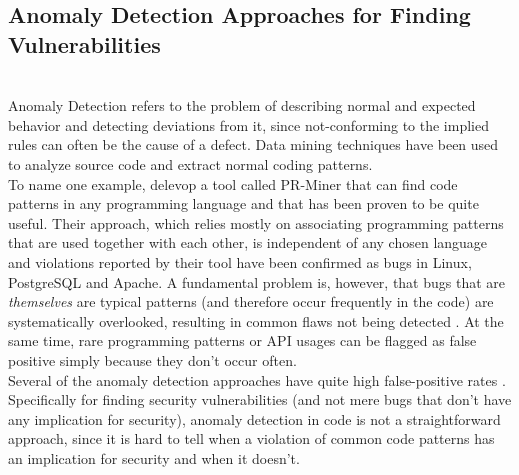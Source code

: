 \documentclass[
	a4paper,
	pagesize,
	pdftex,
	12pt,
	twoside, %
	BCOR=5mm, %
	ngerman,
	fleqn,
	final,
	]{scrartcl}
\begin{document}
\subsection{Anomaly Detection Approaches for Finding Vulnerabilities}\mbox{}\\
Anomaly Detection refers to the problem of describing normal and expected behavior and detecting deviations from it, since not-conforming to the implied rules can often be the cause of a defect. Data mining techniques have been used to analyze source code and extract normal coding patterns.\\
To name one example, \cite{Li.2005} delevop a tool called PR-Miner that can find code patterns in any programming language and that has been proven to be quite useful. Their approach, which relies mostly on associating programming patterns that are used together with each other, is independent of any chosen language and violations reported by their tool have been confirmed as bugs in Linux, PostgreSQL and Apache. A fundamental problem is, however, that bugs that are \textit{themselves} are typical patterns (and therefore occur frequently in the code) are systematically overlooked, resulting in common flaws not being detected \cite{Yamaguchi.2012}. At the same time, rare programming patterns or API usages can be flagged as false positive simply because they don't occur often.\\
Several of the anomaly detection approaches have quite high false-positive rates \citep{Ghaffarian.2017}. Specifically for finding security vulnerabilities (and not mere bugs that don't have any implication for security), anomaly detection in code is not a straightforward approach, since it is hard to tell when a violation of common code patterns has an implication for security and when it doesn't.\\
\end{document}
